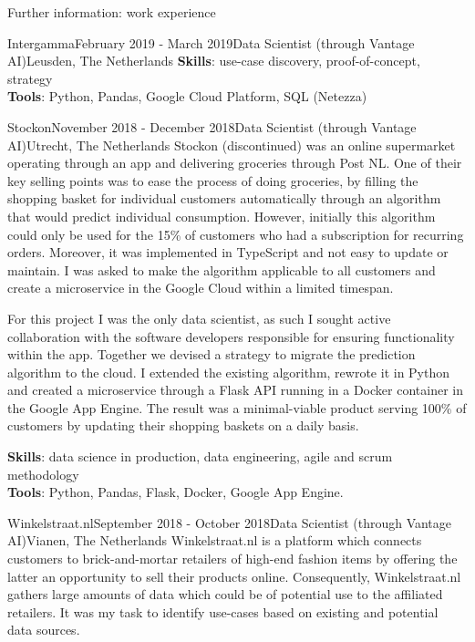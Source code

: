 \begin{rSection}{Further information: work experience}
\begin{rSubsection}{Intergamma}{February 2019 - March 2019}{Data Scientist (through Vantage AI)}{Leusden, The Netherlands}
{\bf Skills}: use-case discovery, proof-of-concept, strategy\\
{\bf Tools}: Python, Pandas, Google Cloud Platform, SQL (Netezza)
%
\end{rSubsection}
\begin{rSubsection}{Stockon}{November 2018 - December 2018}{Data Scientist (through Vantage AI)}{Utrecht, The Netherlands}
%
Stockon (discontinued) was an online supermarket operating through an app and delivering groceries through Post NL.
One of their key selling points was to ease the process of doing groceries, by filling the shopping basket 
for individual customers automatically through an algorithm that would predict individual consumption.
However, initially this algorithm could only be used for the 15\% of customers who had a subscription for recurring orders.
Moreover, it was implemented in TypeScript and not easy to update or maintain. 
I was asked to make the algorithm applicable to all customers and create a microservice in the Google Cloud within a limited timespan.

For this project I was the only data scientist, as such I sought active collaboration with the software developers responsible for ensuring functionality within the app.
Together we devised a strategy to migrate the prediction algorithm to the cloud.
I extended the existing algorithm, rewrote it in Python and created a microservice through a Flask API running
in a Docker container in the Google App Engine. The result was a minimal-viable product serving
100\% of customers by updating their shopping baskets on a daily basis.

{\bf Skills}: data science in production, data engineering, agile and scrum methodology\\
{\bf Tools}: Python, Pandas, Flask, Docker, Google App Engine.
%
\end{rSubsection}
\begin{rSubsection}{Winkelstraat.nl}{September 2018 - October 2018}{Data Scientist (through Vantage AI)}{Vianen, The Netherlands}
%
Winkelstraat.nl is a platform which connects customers to brick-and-mortar retailers of high-end fashion items by 
offering the latter an opportunity to sell their products online. Consequently, Winkelstraat.nl gathers large amounts of
data which could be of potential use to the affiliated retailers. It was my task to identify use-cases based on existing
and potential data sources.


\end{rSubsection}
\end{rSection}
